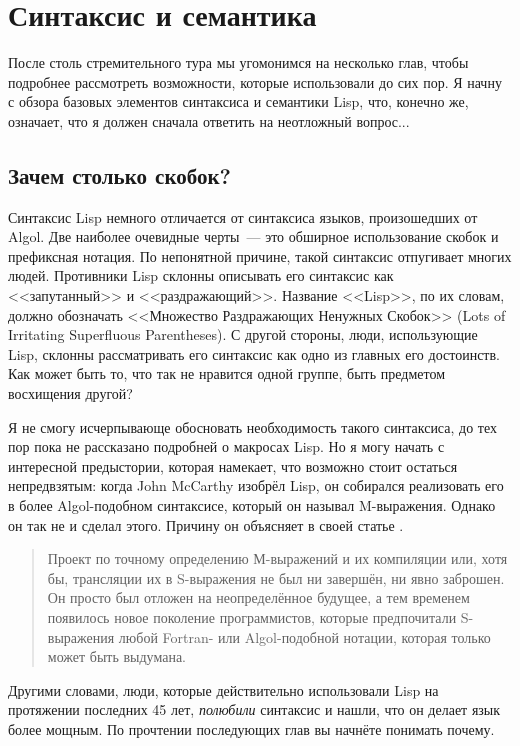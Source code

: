 \chapter{Синтаксис и семантика}
\label{ch:04}

После столь стремительного тура мы угомонимся на несколько глав, чтобы подробнее
рассмотреть возможности, которые использовали до сих пор. Я начну с обзора базовых
элементов синтаксиса и семантики Lisp, что, конечно же, означает, что я должен сначала
ответить на неотложный вопрос...

\section{Зачем столько скобок?}

Синтаксис Lisp немного отличается от синтаксиса языков, произошедших от Algol. Две
наиболее очевидные черты~--- это обширное использование скобок и префиксная нотация. По
непонятной причине, такой синтаксис отпугивает многих людей. Противники Lisp склонны
описывать его синтаксис как <<запутанный>> и <<раздражающий>>. Название <<Lisp>>, по их словам,
должно обозначать <<Множество Раздражающих Ненужных Скобок>> (Lots of Irritating Superfluous
Parentheses). С другой стороны, люди, использующие Lisp, склонны рассматривать его
синтаксис как одно из главных его достоинств. Как может быть то, что так не нравится одной
группе, быть предметом восхищения другой?

Я не смогу исчерпывающе обосновать необходимость такого синтаксиса, до тех пор пока не
рассказано подробней о макросах Lisp. Но я могу начать с интересной предыстории, которая
намекает, что возможно стоит остаться непредвзятым: когда John McCarthy изобрёл Lisp, он
собирался реализовать его в более Algol-подобном синтаксисе, который он называл
M-выражения. Однако он так не и сделал этого. Причину он объясняет в своей статье
.

\begin{quote}
  Проект по точному определению М-выражений и их компиляции или, хотя бы, трансляции их в
  S-выражения не был ни завершён, ни явно заброшен. Он просто был отложен на
  неопределённое будущее, а тем временем появилось новое поколение программистов, которые
  предпочитали S-выражения любой Fortran- или Algol-подобной нотации, которая только может
  быть выдумана.
\end{quote}

Другими словами, люди, которые действительно использовали Lisp на протяжении последних 45
лет, \textit{полюбили} синтаксис и нашли, что он делает язык более мощным. По прочтении
последующих глав вы начнёте понимать почему.

